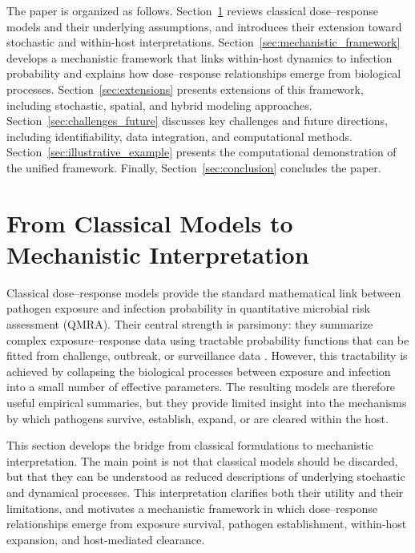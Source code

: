 \documentclass[11pt]{article}
\begin{document}
The paper is organized as follows. Section~\ref{sec:classical_to_mechanistic} reviews classical dose--response models and their underlying assumptions, and introduces their extension toward stochastic and within-host interpretations. Section~\ref{sec:mechanistic_framework} develops a mechanistic framework that links within-host dynamics to infection probability and explains how dose--response relationships emerge from biological processes. Section~\ref{sec:extensions} presents extensions of this framework, including stochastic, spatial, and hybrid modeling approaches. Section~\ref{sec:challenges_future} discusses key challenges and future directions, including identifiability, data integration, and computational methods. Section~\ref{sec:illustrative_example} presents the computational demonstration of the unified framework. Finally, Section~\ref{sec:conclusion} concludes the paper.


\section{From Classical Models to Mechanistic Interpretation} %
\label{sec:classical_to_mechanistic}

Classical dose--response models provide the standard mathematical link between pathogen exposure and infection probability in quantitative microbial risk assessment (QMRA). Their central strength is parsimony: they summarize complex exposure--response data using tractable probability functions that can be fitted from challenge, outbreak, or surveillance data \cite{Haas2014QMRA,Schmidt2013QMRA,Teunis2000BetaPoissonNotSingleHit}. However, this tractability is achieved by collapsing the biological processes between exposure and infection into a small number of effective parameters. The resulting models are therefore useful empirical summaries, but they provide limited insight into the mechanisms by which pathogens survive, establish, expand, or are cleared within the host.

This section develops the bridge from classical formulations to mechanistic interpretation. The main point is not that classical models should be discarded, but that they can be understood as reduced descriptions of underlying stochastic and dynamical processes. This interpretation clarifies both their utility and their limitations, and motivates a mechanistic framework in which dose--response relationships emerge from exposure survival, pathogen establishment, within-host expansion, and host-mediated clearance.
\end{document}
